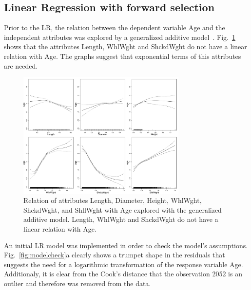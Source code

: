 \documentclass[10pt, paper=a4]{article}
\begin{document}
\subsection{Linear Regression with forward selection}
Prior to the LR, the relation between the dependent variable Age and
the independent attributes was explored by a generalized additive
model~\cite{gam}.  Fig.~\ref{fig:gam} shows that the attributes
Length, WhlWght and ShckdWght do not have a linear relation with Age.
The graphs suggest that exponential terms of this attributes are
needed.

\begin{figure}[h]
  \centering
  \includegraphics[width = 0.75\textwidth]{gam.pdf}
  \caption{Relation of attributes Length, Diameter, Height, WhlWght,
    ShckdWght, and ShllWght with Age explored with the generalized
    additive model.  Length, WhlWght and ShckdWght do not have a
    linear relation with Age.}
  \label{fig:gam}
\end{figure}

An initial LR model was implemented in order to check
the model's assumptions.  Fig.~\ref{fig:modelcheck}a clearly shows a
trumpet shape in the residuals that suggests the need for a logarithmic transformation
of the response variable Age.  Additionaly, it is clear from the
Cook's distance that the observation 2052 is an outlier and therefore was removed from the data.
\end{document}
